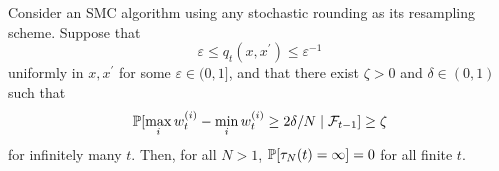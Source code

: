 \begin{lemma}\label{thm:SR_nontriviality}
Consider an SMC algorithm using any stochastic rounding as its resampling scheme.
Suppose that 
\begin{equation*}
\varepsilon \leq q_t(x, x^\prime) \leq \varepsilon^{-1}
\end{equation*}
uniformly in $x,x^\prime$ for some $\varepsilon \in (0,1]$, and that there exist $\zeta >0$ and $\delta \in (0,1)$ such that 
\begin{equation*}
\mathbb{P}[ \max_i w_t^{(i)} - \min_i w_t^{(i)} \geq 2\delta/N \mid \mathcal{F}_{t-1} ] \geq \zeta
\end{equation*}
 for infinitely many $t$. Then, for all $N>1$, $\mathbb{P}[ \tau_N(t) = \infty ] =0$ for all finite $t$.
\end{lemma}


